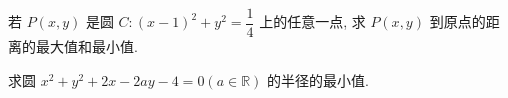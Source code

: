 \clearpage
\review
\clearpage
\hw
\begin{homework}
    若 $ P(x, y) $ 是圆 $ C:(x-1)^{2}+y^{2}=\dfrac{1}{4}$  上的任意一点, 求 $ P(x, y) $ 到原点的距离的最大值和最小值.
\end{homework}
\begin{homework}
    求圆  $x^{2}+y^{2}+2 x-2 a y-4=0(a \in \mathbb{R})$  的半径的最小值.
\end{homework}
\begin{homework}
    
\end{homework}
\begin{homework}
    
\end{homework}
\begin{homework}
    
\end{homework}
\begin{homework}
    
\end{homework}
\begin{homework}
    
\end{homework}
\begin{homework}
    
\end{homework}
\begin{homework}
    
\end{homework}
\clearpage
